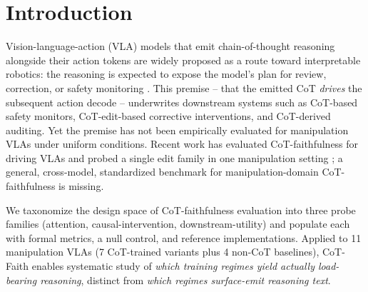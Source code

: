 \documentclass{article}
\begin{document}
\section{Introduction}
\label{sec:intro}

Vision-language-action (VLA) models that emit chain-of-thought reasoning alongside their action tokens are widely proposed as a route toward interpretable robotics: the reasoning is expected to expose the model's plan for review, correction, or safety monitoring \citep{ecot,cotvla,ecotlite}. This premise -- that the emitted CoT \emph{drives} the subsequent action decode -- underwrites downstream systems such as CoT-based safety monitors, CoT-edit-based corrective interventions, and CoT-derived auditing. Yet the premise has not been empirically evaluated for manipulation VLAs under uniform conditions. Recent work has evaluated CoT-faithfulness for driving VLAs \citep{vladrivebench,pinocchio} and probed a single edit family in one manipulation setting \citep{doubleedged}; a general, cross-model, standardized benchmark for manipulation-domain CoT-faithfulness is missing.

We taxonomize the design space of CoT-faithfulness evaluation into three probe families (attention, causal-intervention, downstream-utility) and populate each with formal metrics, a null control, and reference implementations. Applied to 11 manipulation VLAs (7 CoT-trained variants plus 4 non-CoT baselines), CoT-Faith enables systematic study of \emph{which training regimes yield actually load-bearing reasoning}, distinct from \emph{which regimes surface-emit reasoning text}.
\end{document}
